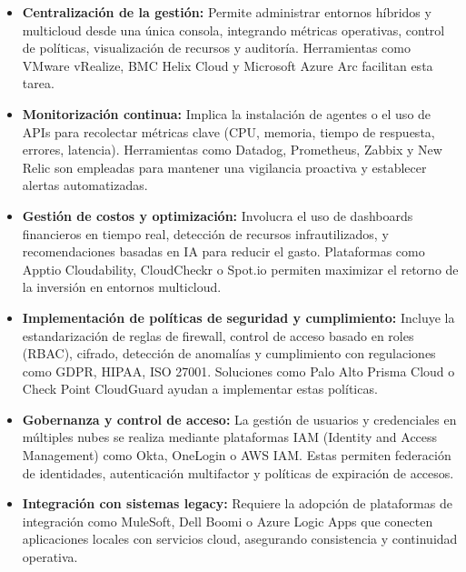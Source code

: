 {            \begin{itemize}
                \item \textbf{Centralización de la gestión:} Permite administrar entornos híbridos y multicloud desde una única consola, integrando métricas operativas, control de políticas, visualización de recursos y auditoría. Herramientas como VMware vRealize, BMC Helix Cloud y Microsoft Azure Arc facilitan esta tarea.
                
                \item \textbf{Monitorización continua:} Implica la instalación de agentes o el uso de APIs para recolectar métricas clave (CPU, memoria, tiempo de respuesta, errores, latencia). Herramientas como Datadog, Prometheus, Zabbix y New Relic son empleadas para mantener una vigilancia proactiva y establecer alertas automatizadas.
                
                \item \textbf{Gestión de costos y optimización:} Involucra el uso de dashboards financieros en tiempo real, detección de recursos infrautilizados, y recomendaciones basadas en IA para reducir el gasto. Plataformas como Apptio Cloudability, CloudCheckr o Spot.io permiten maximizar el retorno de la inversión en entornos multicloud.
                
                \item \textbf{Implementación de políticas de seguridad y cumplimiento:} Incluye la estandarización de reglas de firewall, control de acceso basado en roles (RBAC), cifrado, detección de anomalías y cumplimiento con regulaciones como GDPR, HIPAA, ISO 27001. Soluciones como Palo Alto Prisma Cloud o Check Point CloudGuard ayudan a implementar estas políticas.
                
                \item \textbf{Gobernanza y control de acceso:} La gestión de usuarios y credenciales en múltiples nubes se realiza mediante plataformas IAM (Identity and Access Management) como Okta, OneLogin o AWS IAM. Estas permiten federación de identidades, autenticación multifactor y políticas de expiración de accesos.
                
                \item \textbf{Integración con sistemas legacy:} Requiere la adopción de plataformas de integración como MuleSoft, Dell Boomi o Azure Logic Apps que conecten aplicaciones locales con servicios cloud, asegurando consistencia y continuidad operativa.
            \end{itemize}
            
}
